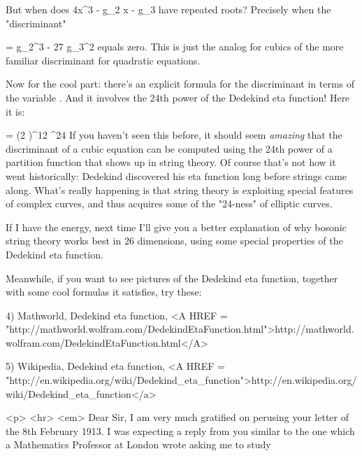 But when does 4x^{3} - g_{2} x - g_{3} have
repeated roots?  Precisely when the "discriminant"

\Delta  = g_{2}^{3} - 27 g_{3}^{2} 
equals zero.  This is just the analog for cubics of the more familiar
discriminant for quadratic equations.  

Now for the cool part: there's an explicit formula for the discriminant
in terms of the variable \tau .  And it involves the 24th power of the 
Dedekind eta function!  Here it is:

                     \Delta  = (2 \pi )^{12} \eta ^{24} 
If you haven't seen this before, it should seem \emph{amazing} that the
discriminant of a cubic equation can be computed using the 24th power of
a partition function that shows up in string theory.  Of course that's
not how it went historically: Dedekind discovered his eta function long
before strings came along.  What's really happening is that string
theory is exploiting special features of complex curves, and thus acquires
some of the "24-ness" of elliptic curves.

If I have the energy, next time I'll give you a better explanation of
why bosonic string theory works best in 26 dimensions, using some
special properties of the Dedekind eta function.

Meanwhile, if you want to see pictures of the Dedekind eta function,
together with some cool formulas it satisfies, try these:

4) Mathworld, Dedekind eta function, 
<A HREF = "http://mathworld.wolfram.com/DedekindEtaFunction.html">http://mathworld.wolfram.com/DedekindEtaFunction.html</A>

5) Wikipedia, Dedekind eta function,
<A HREF = "http://en.wikipedia.org/wiki/Dedekind_eta_function">http://en.wikipedia.org/wiki/Dedekind_eta_function</a>


<p> <hr>
<em>
Dear Sir,
I am very much gratified on perusing your letter of the 8th
February 1913.  I was expecting a reply from you similar to the one
which a Mathematics Professor at London wrote asking me to study


